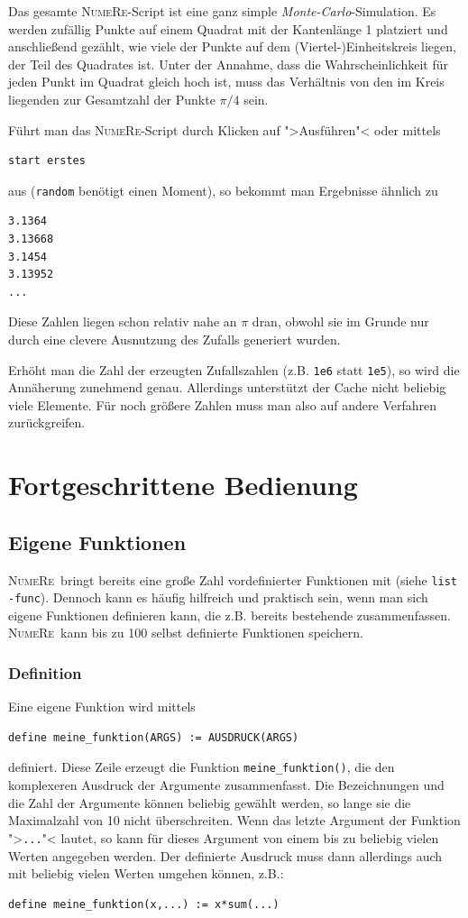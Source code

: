 \documentclass[DIV=14,headsepline,footsepline]{scrbook}
\newcommand{\NR}{\textsc{Nu\-me\-Re}}
\begin{document}
				Das gesamte \NR-Script ist eine ganz simple \emph{Monte-Carlo}-Simulation. Es werden zufällig Punkte auf einem Quadrat mit der Kantenlänge 1 platziert und anschließend gezählt, wie viele der Punkte auf dem (Viertel-)Einheitskreis liegen, der Teil des Quadrates ist. Unter der Annahme, dass die Wahrscheinlichkeit für jeden Punkt im Quadrat gleich hoch ist, muss das Verhältnis von den im Kreis liegenden zur Gesamtzahl der Punkte $\pi/4$ sein.
				
				Führt man das \NR-Script durch Klicken auf ">Ausführen"< oder mittels
				\begin{lstlisting}
start erstes
				\end{lstlisting}
				aus (\verb+random+ benötigt einen Moment), so bekommt man Ergebnisse ähnlich zu
				\begin{lstlisting}
3.1364
3.13668
3.1454
3.13952
...
				\end{lstlisting}
				Diese Zahlen liegen schon relativ nahe an $\pi$ dran, obwohl sie im Grunde nur durch eine clevere Ausnutzung des Zufalls generiert wurden.
				
				Erhöht man die Zahl der erzeugten Zufallszahlen (z.B. \verb+1e6+ statt \verb+1e5+), so wird die Annäherung zunehmend genau. Allerdings unterstützt der Cache nicht beliebig viele Elemente. Für noch größere Zahlen muss man also auf andere Verfahren zurückgreifen.
	\part{Fortgeschrittene Bedienung}
		\chapter{Eigene Funktionen}
			\NR\ bringt bereits eine große Zahl vordefinierter Funktionen mit (siehe \verb+list -func+). Dennoch kann es häufig hilfreich und praktisch sein, wenn man sich eigene Funktionen definieren kann, die z.B. bereits bestehende zusammenfassen. \NR\ kann bis zu 100 selbst definierte Funktionen speichern.
			\section{Definition}
				Eine eigene Funktion wird mittels
				\begin{lstlisting}
define meine_funktion(ARGS) := AUSDRUCK(ARGS)
				\end{lstlisting}
				definiert. Diese Zeile erzeugt die Funktion \verb+meine_funktion()+, die den komplexeren Ausdruck der Argumente zusammenfasst. Die Bezeichnungen und die Zahl der Argumente können beliebig gewählt werden, so lange sie die Maximalzahl von 10 nicht überschreiten. Wenn das letzte Argument der Funktion ">\verb+...+"< lautet, so kann für dieses Argument von einem bis zu beliebig vielen Werten angegeben werden. Der definierte Ausdruck muss dann allerdings auch mit beliebig vielen Werten umgehen können, z.B.:
				\begin{lstlisting}
define meine_funktion(x,...) := x*sum(...)
				\end{lstlisting}
				
\end{document}
